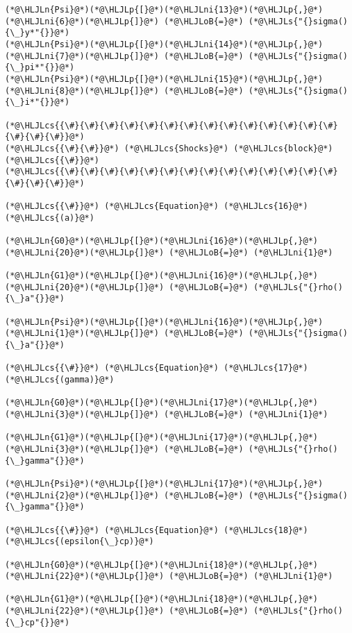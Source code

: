 \documentclass[12pt,a4paper]{article}
\newcommand{\HLJLn}[1]{#1}
\newcommand{\HLJLs}[1]{\textcolor[RGB]{201,61,57}{#1}}
\newcommand{\HLJLni}[1]{\textcolor[RGB]{59,151,46}{#1}}
\newcommand{\HLJLoB}[1]{\textcolor[RGB]{102,102,102}{\textbf{#1}}}
\newcommand{\HLJLp}[1]{#1}
\newcommand{\HLJLcs}[1]{\textcolor[RGB]{153,153,119}{\textit{#1}}}
\begin{document}
\begin{lstlisting}
(*@\HLJLn{Psi}@*)(*@\HLJLp{[}@*)(*@\HLJLni{13}@*)(*@\HLJLp{,}@*)(*@\HLJLni{6}@*)(*@\HLJLp{]}@*) (*@\HLJLoB{=}@*) (*@\HLJLs{"{}sigma(){\_}y*"{}}@*)
(*@\HLJLn{Psi}@*)(*@\HLJLp{[}@*)(*@\HLJLni{14}@*)(*@\HLJLp{,}@*)(*@\HLJLni{7}@*)(*@\HLJLp{]}@*) (*@\HLJLoB{=}@*) (*@\HLJLs{"{}sigma(){\_}pi*"{}}@*)
(*@\HLJLn{Psi}@*)(*@\HLJLp{[}@*)(*@\HLJLni{15}@*)(*@\HLJLp{,}@*)(*@\HLJLni{8}@*)(*@\HLJLp{]}@*) (*@\HLJLoB{=}@*) (*@\HLJLs{"{}sigma(){\_}i*"{}}@*)

(*@\HLJLcs{{\#}{\#}{\#}{\#}{\#}{\#}{\#}{\#}{\#}{\#}{\#}{\#}{\#}{\#}{\#}{\#}{\#}}@*)
(*@\HLJLcs{{\#}{\#}}@*) (*@\HLJLcs{Shocks}@*) (*@\HLJLcs{block}@*) (*@\HLJLcs{{\#}}@*)
(*@\HLJLcs{{\#}{\#}{\#}{\#}{\#}{\#}{\#}{\#}{\#}{\#}{\#}{\#}{\#}{\#}{\#}{\#}{\#}}@*)

(*@\HLJLcs{{\#}}@*) (*@\HLJLcs{Equation}@*) (*@\HLJLcs{16}@*) (*@\HLJLcs{(a)}@*)

(*@\HLJLn{G0}@*)(*@\HLJLp{[}@*)(*@\HLJLni{16}@*)(*@\HLJLp{,}@*)(*@\HLJLni{20}@*)(*@\HLJLp{]}@*) (*@\HLJLoB{=}@*) (*@\HLJLni{1}@*)

(*@\HLJLn{G1}@*)(*@\HLJLp{[}@*)(*@\HLJLni{16}@*)(*@\HLJLp{,}@*)(*@\HLJLni{20}@*)(*@\HLJLp{]}@*) (*@\HLJLoB{=}@*) (*@\HLJLs{"{}rho(){\_}a"{}}@*)

(*@\HLJLn{Psi}@*)(*@\HLJLp{[}@*)(*@\HLJLni{16}@*)(*@\HLJLp{,}@*)(*@\HLJLni{1}@*)(*@\HLJLp{]}@*) (*@\HLJLoB{=}@*) (*@\HLJLs{"{}sigma(){\_}a"{}}@*)

(*@\HLJLcs{{\#}}@*) (*@\HLJLcs{Equation}@*) (*@\HLJLcs{17}@*) (*@\HLJLcs{(gamma)}@*)

(*@\HLJLn{G0}@*)(*@\HLJLp{[}@*)(*@\HLJLni{17}@*)(*@\HLJLp{,}@*)(*@\HLJLni{3}@*)(*@\HLJLp{]}@*) (*@\HLJLoB{=}@*) (*@\HLJLni{1}@*)

(*@\HLJLn{G1}@*)(*@\HLJLp{[}@*)(*@\HLJLni{17}@*)(*@\HLJLp{,}@*)(*@\HLJLni{3}@*)(*@\HLJLp{]}@*) (*@\HLJLoB{=}@*) (*@\HLJLs{"{}rho(){\_}gamma"{}}@*)

(*@\HLJLn{Psi}@*)(*@\HLJLp{[}@*)(*@\HLJLni{17}@*)(*@\HLJLp{,}@*)(*@\HLJLni{2}@*)(*@\HLJLp{]}@*) (*@\HLJLoB{=}@*) (*@\HLJLs{"{}sigma(){\_}gamma"{}}@*)

(*@\HLJLcs{{\#}}@*) (*@\HLJLcs{Equation}@*) (*@\HLJLcs{18}@*) (*@\HLJLcs{(epsilon{\_}cp)}@*)

(*@\HLJLn{G0}@*)(*@\HLJLp{[}@*)(*@\HLJLni{18}@*)(*@\HLJLp{,}@*)(*@\HLJLni{22}@*)(*@\HLJLp{]}@*) (*@\HLJLoB{=}@*) (*@\HLJLni{1}@*)

(*@\HLJLn{G1}@*)(*@\HLJLp{[}@*)(*@\HLJLni{18}@*)(*@\HLJLp{,}@*)(*@\HLJLni{22}@*)(*@\HLJLp{]}@*) (*@\HLJLoB{=}@*) (*@\HLJLs{"{}rho(){\_}cp"{}}@*)


\end{lstlisting}
\end{document}
